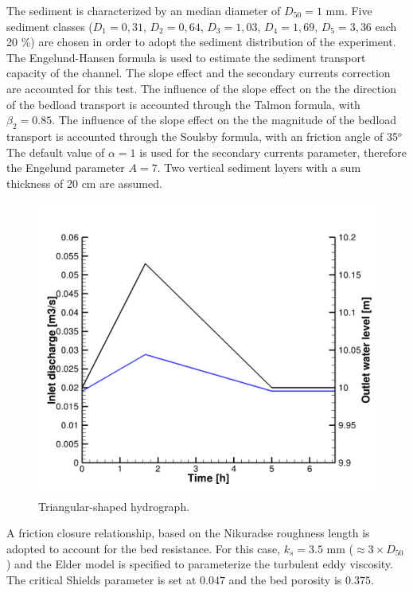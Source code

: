 The sediment is characterized by an median diameter of $D_{50}=1$ mm. Five sediment classes 
($D_1=0,31$, $D_2=0,64$, $D_3=1,03$, $D_4=1,69$, $D_5=3,36$ each 20 \%) are chosen in order to adopt the sediment distribution 
of the experiment. 
 The Engelund-Hansen formula is used to estimate the sediment transport capacity of the channel. The slope effect and the 
secondary currents correction are accounted for this test. The influence of the slope effect on the the direction of the bedload 
transport is accounted through the Talmon formula, with $\beta_2=0.85$. 
The influence of the slope effect on the the magnitude of the bedload transport is accounted through the Soulsby formula, with 
an friction angle of 35$^o$
The default value of $\alpha=1$ is used for the secondary currents parameter, therefore the Engelund parameter $A=7$. 
Two vertical sediment layers with a sum thickness of 20 cm are assumed.

\begin{figure} [!h]
\centering
\includegraphics[scale=0.15, bb=0 0 30 30]{img/yen_boundaries.png}
 \caption{Triangular-shaped hydrograph.}\label{fig:hydro}
\end{figure}

A friction closure relationship, based on the Nikuradse roughness length is adopted to
account for the bed resistance. For this case, $k_s=3.5$ mm ($\approx 3\times D_{50}$) and the Elder model is specified to 
parameterize the turbulent eddy viscosity. 
The critical Shields parameter is set at $0.047$ and the bed porosity is $0.375$.


